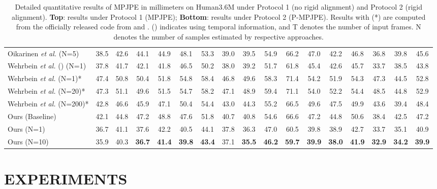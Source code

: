 \documentclass[letterpaper, 10 pt, conference]{ieeeconf}
\begin{document}
\begin{table*}[t]
{\begin{tabular}{l|ccccccccccccccc|c}
        Oikarinen \textit{et al.} \cite{oikarinen2021graphmdn} (N=5)  & 38.5 & 42.6 & 44.1 & 44.9 & 48.1 & 53.3 & 39.0 & 39.5 & 54.9 & 66.2 & 47.0 & 42.2 & 46.8 & 36.8 & 39.8 & 45.6 \\
        Wehrbein \textit{et al.} \cite{wehrbein2021probabilistic} () (N=1)  & 37.8& 41.7& 42.1& 41.8& 46.5& 50.2& 38.0& 39.2& 51.7& 61.8& 45.4& 42.6& 45.7& 33.7& 38.5& 43.8 \\
        Wehrbein \textit{et al.} \cite{wehrbein2021probabilistic} (N=1)* & 47.4 & 50.8 & 50.4 & 51.8 & 54.8 & 58.4 & 46.8 & 49.6 & 58.3 & 71.4 & 54.2 & 51.9 & 54.3 & 47.3 & 44.5 & 52.8 \\
        Wehrbein \textit{et al.} \cite{wehrbein2021probabilistic} (N=20)* & 47.3 & 51.1 & 49.6 & 51.5 & 54.7 & 58.2 & 47.1 & 48.9 & 59.4 & 71.1 & 54.0 &52.2& 54.4 & 48.5 & 44.8 & 52.9 \\
        Wehrbein \textit{et al.} \cite{wehrbein2021probabilistic} (N=200)* & 42.8 & 46.6 & 45.9 & 47.1 & 50.4 & 54.4 & 43.0 & 44.3 & 55.2 & 66.5 & 49.6 & 47.5 & 49.9 & 43.6 & 39.4 & 48.4 \\
        \hline
        Ours (Baseline) & 42.1 & 44.8 & 47.2 & 48.8 & 47.6 & 51.8 & 40.7 & 40.8 & 54.6 & 66.6 & 47.2 & 44.8 & 50.6 & 38.4 & 42.5 & 47.2\\
        Ours (N=1) & 36.7 & 41.1 & 37.6 & 42.2 & 40.5 & 44.1 & 37.8 & 36.3 & 47.0 & 60.5 & 39.8 & 38.9 & 42.7 & 33.7 & 35.1 & 40.9\\
        Ours (N=10) & 35.9 & 40.3 & \textbf{36.7}&\textbf{41.4} & \textbf{39.8} & \textbf{43.4} & 37.1 & \textbf{35.5} & \textbf{46.2} & \textbf{59.7} & \textbf{39.9} & \textbf{38.0}& \textbf{41.9} & \textbf{32.9}  & \textbf{34.2}& \textbf{39.9} \\
        \bottomrule
    \end{tabular}
    }
    \caption{Detailed quantitative results of MPJPE in millimeters on Human3.6M under Protocol 1 (no rigid alignment) and Protocol 2 (rigid alignment). \textbf{Top}: results under Protocol 1 (MPJPE); \textbf{Bottom}: results under Protocol 2 (P-MPJPE). Results with (*) are computed from the officially released code from \cite{sharma2019monocular} and \cite{wehrbein2021probabilistic}. () indicates using temporal information, and T denotes the number of input frames. N denotes the number of samples estimated by respective approaches.}
    \label{tab:table1}
    \vspace{-10pt}
\end{table*}  \section{EXPERIMENTS}
\end{document}
